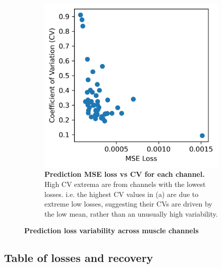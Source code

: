 \documentclass[12pt]{iopart}
\begin{document}
\begin{figure}
\begin{subfigure}[c]{0.48\textwidth}
		\includegraphics[width=\textwidth]{pred_loss_cv_v_mse.png}
		\caption{\textbf{Prediction MSE loss vs CV for each channel.} High CV extrema are from channels
                 with the lowest losses. i.e. the highest CV values in (a) are due to extreme
                 low losses, suggesting their CVs are driven by the low mean, rather than an
                 unusually high variability.}
	\end{subfigure}
	\hfill
\caption{\textbf{Prediction loss variability across muscle channels}}
\label{fig:pred_loss_cv}
\end{figure}


\subsection{Table of losses and recovery}
\label{sup:results}
\end{document}
